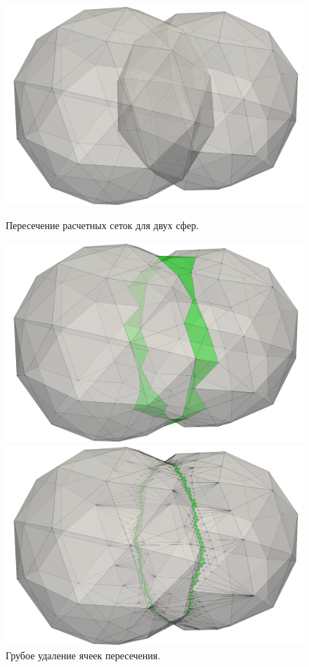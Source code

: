 \documentclass[
11pt,%
tightenlines,%
twoside,%
onecolumn,%
nofloats,%
nobibnotes,%
nofootinbib,%
superscriptaddress,%
noshowpacs,%
centertags]%
{revtex4}
\begin{document}
\begin{figure}[h]
  \centering
  \begin{minipage}[h]{0.32\textwidth}
    \includegraphics[width=\textwidth]{pics/pic_zip_01.png}
    \caption{Пересечение расчетных сеток для двух сфер.}\label{fig:pic_zip_01}
  \end{minipage}
  \hfill
  \begin{minipage}[h]{0.32\textwidth}
    \includegraphics[width=\textwidth]{pics/pic_zip_09.png}
    \caption{Грубое удаление ячеек пересечения.}\label{fig:pic_zip_09}
  \end{minipage}
  \hfill
  \begin{minipage}[h]{0.32\textwidth}
    \includegraphics[width=\textwidth]{pics/pic_zip_15.png}

\end{minipage}
\end{figure}
\end{document}
